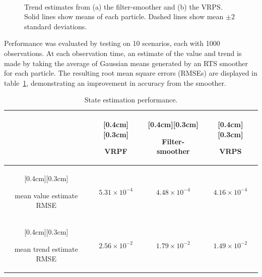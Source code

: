 \documentclass[10pt,twocolumn,twoside]{IEEEtran}
\begin{document}
\begin{figure}[!t]
\centering
{} \\
\caption{Trend estimates from (a) the filter-smoother and (b) the VRPS. Solid lines show means of each particle. Dashed lines show mean $\pm$2 standard deviations.}
\label{fig:example_state}
\end{figure}

Performance was evaluated by testing on 10 scenarios, each with 1000 observations. At each observation time, an estimate of the value and trend is made by taking the average of Gaussian means generated by an RTS smoother for each particle. The resulting root mean square errors (RMSEs) are displayed in table~\ref{tab:finance_state_performance}, demonstrating an improvement in accuracy from the smoother.

\begin{table}%
\caption{State estimation performance.}
\label{tab:finance_state_performance}
\centering
\renewcommand{\arraystretch}{1.5}
\begin{tabular}{|c|c|c|c|}
\hline
 &\raisebox{0cm}[0.4cm][0.3cm]{\parbox[c]{1.5cm}{\centering VRPF}} & \raisebox{0cm}[0.4cm][0.3cm]{\parbox[c]{1.5cm}{\centering Filter-smoother}} & \raisebox{0cm}[0.4cm][0.3cm]{\parbox[c]{1.5cm}{\centering VRPS}} \\
\hline \hline
\raisebox{0cm}[0.4cm][0.3cm]{\parbox[c]{2cm}{\centering mean value estimate RMSE}}   & $5.31 \times 10^{-4}$ & $4.48 \times 10^{-4}$ & $4.16 \times 10^{-4}$ \\
\hline
\raisebox{0cm}[0.4cm][0.3cm]{\parbox[c]{2cm}{\centering mean trend estimate RMSE}}   & $2.56 \times 10^{-2}$ & $1.79 \times 10^{-2}$ & $1.49 \times 10^{-2}$ \\
\hline
\end{tabular}
\end{table}
\end{document}
